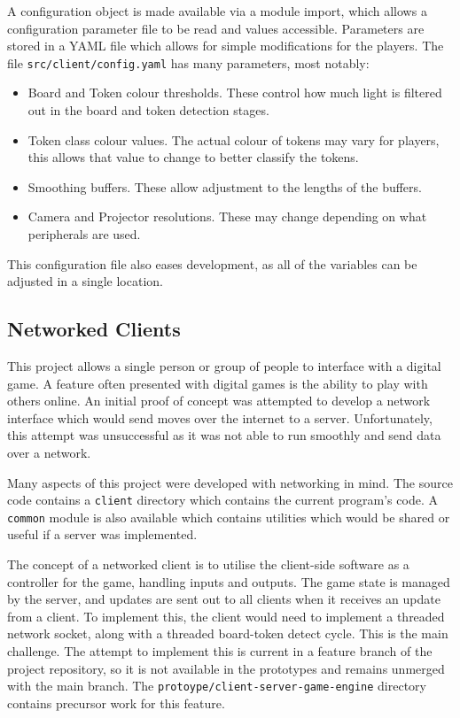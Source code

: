 \documentclass[12pt]{article}
\begin{document}
A configuration object is made available via a module import, which allows a configuration parameter file to be read and values accessible. 
Parameters are stored in a YAML file which allows for simple modifications for the players. 
The file \texttt{src/client/config.yaml} has many parameters, most notably:
\begin{itemize}
    \item Board and Token colour thresholds. These control how much light is filtered out in the board and token detection stages.
    \item Token class colour values. The actual colour of tokens may vary for players, this allows that value to change to better classify the tokens.
    \item Smoothing buffers. These allow adjustment to the lengths of the buffers.
    \item Camera and Projector resolutions. These may change depending on what peripherals are used.
\end{itemize}
This configuration file also eases development, as all of the variables can be adjusted in a single location.

\subsection{Networked Clients}
This project allows a single person or group of people to interface with a digital game. 
A feature often presented with digital games is the ability to play with others online. 
An initial proof of concept was attempted to develop a network interface which would send moves over the internet to a server. 
Unfortunately, this attempt was unsuccessful as it was not able to run smoothly and send data over a network. 

Many aspects of this project were developed with networking in mind. The source code contains a \texttt{client} directory which contains the current program's code. 
A \texttt{common} module is also available which contains utilities which would be shared or useful if a server was implemented. 

The concept of a networked client is to utilise the client-side software as a controller for the game, handling inputs and outputs. 
The game state is managed by the server, and updates are sent out to all clients when it receives an update from a client. 
To implement this, the client would need to implement a threaded network socket, along with a threaded board-token detect cycle. 
This is the main challenge. 
The attempt to implement this is current in a feature branch of the project repository, so it is not available in the prototypes and remains unmerged with the main branch.
The \texttt{protoype/client-server-game-engine} directory contains precursor work for this feature. 
\end{document}
